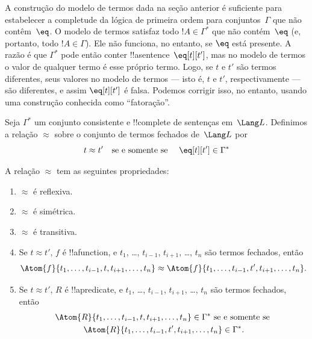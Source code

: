 \documentclass[../../../include/open-logic-section]{subfiles}
\begin{document}

\begin{explain}
A construção do modelo de termos dada na seção anterior é
suficiente para estabelecer a completude da lógica de primeira ordem para
conjuntos~$\Gamma$ que não contêm~$\eq$.  O modelo de termos satisfaz
todo $!A \in \Gamma^*$ que não contém~$\eq$ (e, portanto, todo
$!A \in \Gamma$).  Ele não funciona, no entanto, se $\eq$ está presente.
A razão é que $\Gamma^*$ pode então conter
!!a{sentence}~$\eq[t][t']$, mas no modelo de termos o valor de qualquer
termo é esse próprio termo.  Logo, se $t$ e $t'$ são termos diferentes,
seus valores no modelo de termos --- isto é, $t$ e $t'$,
respectivamente --- são diferentes, e assim $\eq[t][t']$ é falsa.  Podemos
corrigir isso, no entanto, usando uma construção conhecida como ``fatoração''.
\end{explain}

\begin{defn}
  Seja $\Gamma^*$ um conjunto consistente e !!{complete} de sentenças
  em~$\Lang L$.  Definimos a relação $\approx$ sobre o conjunto de termos
  fechados de~$\Lang L$ por
  \[
  t \approx t' \text{\quad se e somente se \quad} \eq[t][t'] \in \Gamma^*
  \]
\end{defn}

\begin{prop}
A relação $\approx$ tem as seguintes propriedades:
\begin{enumerate}
\item $\approx$ é reflexiva.
\item $\approx$ é simétrica.
\item  $\approx$ é transitiva.
\item Se $t \approx t'$, $f$ é !!a{function}, e $t_1$, \dots,
  $t_{i-1}$, $t_{i+1}$, \dots, $t_n$ são termos fechados, então
\[
\Atom{f}{t_1,\dots, t_{i-1}, t, t_{i+1}, \dots, t_n} \approx
\Atom{f}{t_1,\dots, t_{i-1}, t', t_{i+1}, \dots, t_n}.
\]
\item Se $t \approx t'$, $R$ é !!a{predicate}, e $t_1$, \dots,
  $t_{i-1}$, $t_{i+1}$, \dots, $t_n$ são termos fechados, então
\begin{multline*}
\Atom{R}{t_1,\dots, t_{i-1}, t, t_{i+1}, \dots, t_n} \in \Gamma^* \text{ se e somente se } \\
\Atom{R}{t_1,\dots, t_{i-1}, t', t_{i+1}, \dots, t_n} \in \Gamma^*.
\end{multline*}
\end{enumerate}
\end{prop}
\end{document}
